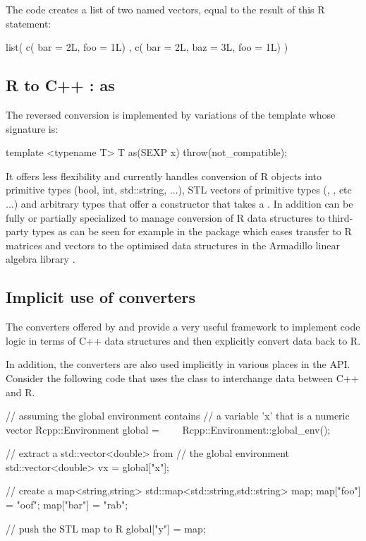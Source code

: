 The code creates a list of two named vectors, equal to the 
result of this R statement:

\begin{example}
list( c( bar = 2L, foo = 1L) , 
      c( bar = 2L, baz = 3L, foo = 1L) )
\end{example}

\subsection{R to C++ : as}

The reversed conversion is implemented by variations of the 
 template whose signature is:
\begin{example}
template <typename T> 
T as(SEXP x) throw(not_compatible);
\end{example}

It offers less flexibility and currently
handles conversion of R objects into primitive types (bool, int, std::string, ...), 
STL vectors of primitive types  (, 
, etc ...) and arbitrary types that offer 
a constructor that takes a . In addition  can 
be fully or partially specialized to manage conversion of R data 
structures to third-party types as can be seen for example in the
 package which eases transfer to R matrices and vectors to
the optimised data structures in the Armadillo linear algebra library \citep{Armadillo}.


\subsection{Implicit use of converters}

The converters offered by  and  provide a very 
useful framework to implement code logic in terms of C++ 
data structures and then explicitly convert data back to R. 

In addition, the converters are also used implicitly
in various places in the  API. 
Consider the following code that uses the  class to 
interchange data between C++ and R.

\begin{example}
// assuming the global environment contains 
// a variable 'x' that is a numeric vector
Rcpp::Environment global = 
\ \ \ \ Rcpp::Environment::global_env();

// extract a std::vector<double> from 
// the global environment
std::vector<double> vx = global["x"];

// create a map<string,string>
std::map<std::string,std::string> map;
map["foo"] = "oof";
map["bar"] = "rab";

// push the STL map to R
global["y"] = map;
\end{example}

